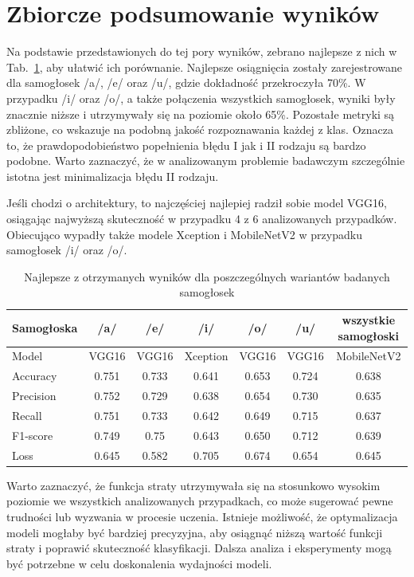 
\section{Zbiorcze podsumowanie wyników}
\label{sec:podsumowanie-wynikow}

Na podstawie przedstawionych do tej pory wyników, zebrano najlepsze z nich w Tab.~\ref{tab:wyniki-podsumowanie}, aby ułatwić ich porównanie.
Najlepsze osiągnięcia zostały zarejestrowane dla samogłosek /a/, /e/ oraz /u/, gdzie dokładność przekroczyła 70\%.
W przypadku /i/ oraz /o/, a także połączenia wszystkich samogłosek, wyniki były znacznie niższe i utrzymywały się na poziomie około 65\%.
Pozostałe metryki są zbliżone, co wskazuje na podobną jakość rozpoznawania każdej z klas.
Oznacza to, że prawdopodobieństwo popełnienia błędu I jak i II rodzaju są bardzo podobne.
Warto zaznaczyć, że w analizowanym problemie badawczym szczególnie istotna jest minimalizacja błędu II rodzaju.

Jeśli chodzi o architektury, to najczęściej najlepiej radził sobie model VGG16, osiągając najwyższą skuteczność w przypadku 4 z 6 analizowanych przypadków.
Obiecująco wypadły także modele Xception i MobileNetV2 w przypadku samogłosek /i/ oraz /o/.

\begin{table}[ht]
\centering
\caption{Najlepsze z otrzymanych wyników dla poszczególnych wariantów badanych samogłosek\@}
\label{tab:wyniki-podsumowanie}
\begin{tabular}{|l|c|c|c|c|c|c|}
\hline
\textbf{Samogłoska} &\textbf{/a/} &\textbf{/e/} &\textbf{/i/} &\textbf{/o/} &\textbf{/u/}  &\textbf{wszystkie samogłoski}\\ \hline
    Model  &VGG16 &VGG16 &Xception &VGG16 &VGG16 &MobileNetV2 \\ \hline
    Accuracy  &0.751 &0.733 &0.641 &0.653 &0.724 &0.638 \\ \hline
    Precision  &0.752 &0.729 &0.638 &0.654 &0.730 &0.635 \\ \hline
    Recall  &0.751 &0.733 &0.642 &0.649 &0.715 &0.637 \\ \hline
    F1-score &0.749 &0.75 &0.643 &0.650 &0.712 &0.639 \\ \hline
    Loss &0.645 &0.582 &0.705 &0.674 &0.654 &0.645 \\ \hline
\end{tabular}
\end{table}

Warto zaznaczyć, że funkcja straty utrzymywała się na stosunkowo wysokim poziomie we wszystkich analizowanych przypadkach, co może sugerować pewne trudności lub wyzwania w procesie uczenia.
Istnieje możliwość, że optymalizacja modeli mogłaby być bardziej precyzyjna, aby osiągnąć niższą wartość funkcji straty i poprawić skuteczność klasyfikacji.
Dalsza analiza i eksperymenty mogą być potrzebne w celu doskonalenia wydajności modeli.